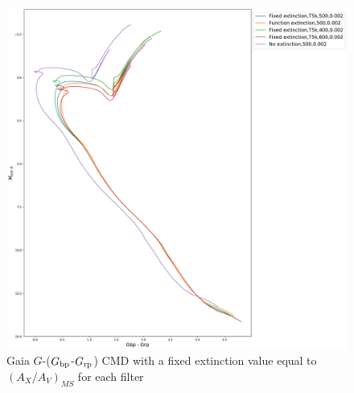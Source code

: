 \documentclass[12pt, a4paper]{report}
\begin{document}
\begin{figure}[h]
\begin{center}
\includegraphics[width=1.0\textwidth]{../basti_isochrones_10_13Gyr/Extinction_T5k_FeH0fix_func_G_GbpmGrp_500_400_600_Myr_FeH_0p002_ref_noext_Av_1p0.pdf}
\caption{Gaia $G$-($G_{\textnormal{bp}}$-$G_{\textnormal{rp}}$) CMD with a fixed extinction value equal to $(A_{X}/A_{V})_{MS}$ for each filter}
\label{gaia_isoc_T5k}
\end{center}
\end{figure}
\end{document}
